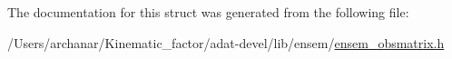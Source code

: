 The documentation for this struct was generated from the following file\+:\begin{DoxyCompactItemize}
\item 
/\+Users/archanar/\+Kinematic\+\_\+factor/adat-\/devel/lib/ensem/\mbox{\hyperlink{adat-devel_2lib_2ensem_2ensem__obsmatrix_8h}{ensem\+\_\+obsmatrix.\+h}}\end{DoxyCompactItemize}
